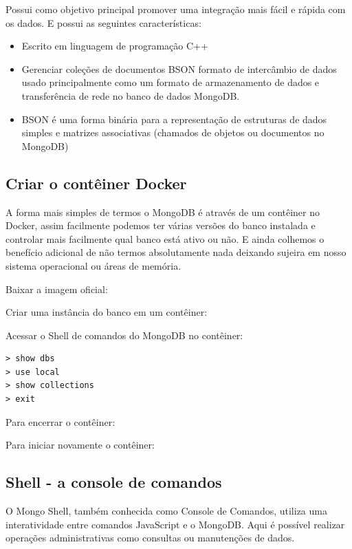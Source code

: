 \documentclass[a4paper,11pt]{article}
\begin{document}
Possui como objetivo principal promover uma integração mais fácil e rápida com os dados. E possui as seguintes características:
\begin{itemize}[nolistsep]
  \item Escrito em linguagem de programação C++
  \item Gerenciar coleções de documentos BSON formato de intercâmbio de dados usado principalmente como um formato de armazenamento de dados e transferência de rede no banco de dados MongoDB.
  \item BSON é uma forma binária para a representação de estruturas de dados simples e matrizes associativas (chamados de objetos ou documentos no MongoDB)
\end{itemize}

\subsection{Criar o contêiner Docker}
A forma mais simples de termos o MongoDB é através de um contêiner no Docker, assim facilmente podemos ter várias versões do banco instalada e controlar mais facilmente qual banco está ativo ou não. E ainda colhemos o benefício adicional de não termos absolutamente nada deixando sujeira em nosso sistema operacional ou áreas de memória.

Baixar a imagem oficial: \\

Criar uma instância do banco em um contêiner: \\

Acessar o Shell de comandos do MongoDB no contêiner: \\
\begin{lstlisting}
> show dbs
> use local
> show collections
> exit
\end{lstlisting}

Para encerrar o contêiner: \\

Para iniciar novamente o contêiner: \\

\subsection{Shell - a console de comandos}
O Mongo Shell, também conhecida como Console de Comandos, utiliza uma interatividade entre comandos JavaScript e o MongoDB. Aqui é possível realizar operações administrativas como consultas ou manutenções de dados.
\end{document}
